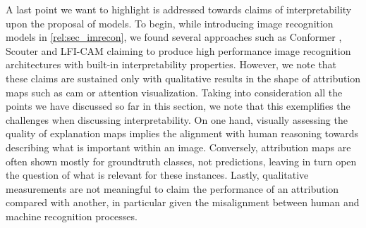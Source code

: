 \noindent A last point we want to highlight is addressed towards claims of interpretability upon 
the proposal of models. To begin, while introducing image recognition models in 
\autoref{rel:sec_imrecon}, we found several approaches such as Conformer 
\autocite{peng2021conformer}, Scouter \autocite{li2021scouter} and LFI-CAM \autocite{lee2021lfi} 
claiming to produce high performance image recognition architectures with built-in interpretability 
properties. However, we note that these claims are sustained only with qualitative results in the 
shape of attribution maps such as \gls{cam} or attention visualization. Taking into consideration 
all the points we have discussed so far in this section, we note that this exemplifies the 
challenges when discussing interpretability. On one hand, visually assessing the quality of 
explanation maps implies the alignment with human reasoning towards describing what is important 
within an image. Conversely, attribution maps are often shown mostly for groundtruth classes, not 
predictions, leaving in turn open the question of what is relevant for these instances. Lastly, 
qualitative measurements are not meaningful to claim the performance of an attribution compared 
with another, in particular given the misalignment between human and machine recognition processes.

